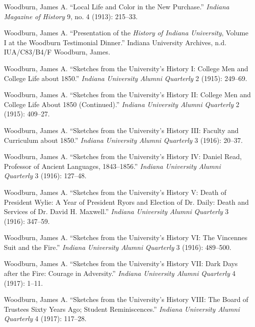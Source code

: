 \documentclass[
  american,
  letterpaper,
]{scrreprt}
\newlength{\cslhangindent}
\newenvironment{CSLReferences}[2] %
 {\begin{list}{}{%
  \setlength{\itemindent}{0pt}
  \setlength{\leftmargin}{0pt}
  \setlength{\parsep}{0pt}
  \ifodd #1
   \setlength{\leftmargin}{\cslhangindent}
   \setlength{\itemindent}{-1\cslhangindent}
  \fi
  \setlength{\itemsep}{#2\baselineskip}}}
 {\end{list}}
\begin{document}
\begin{CSLReferences}{1}{0}
Woodburn, James A. {``Local Life and Color in the New Purchase.''}
\emph{Indiana Magazine of History} 9, no. 4 (1913): 215--33.

Woodburn, James A. {``Presentation of the \emph{History of Indiana
University}, Volume {I} at the Woodburn Testimonial Dinner.''} Indiana
University Archives, n.d. IUA/C83/B4/F Woodburn, James.

Woodburn, James A. {``{Sketches from the University's History I: College
Men and College Life about 1850}.''} \emph{Indiana University Alumni
Quarterly} 2 (1915): 249--69.

Woodburn, James A. {``{Sketches from the University's History II:
College Men and College Life About 1850 (Continued)}.''} \emph{Indiana
University Alumni Quarterly} 2 (1915): 409--27.

Woodburn, James A. {``{Sketches from the University's History III:
Faculty and Curriculum about 1850}.''} \emph{Indiana University Alumni
Quarterly} 3 (1916): 20--37.

Woodburn, James A. {``{Sketches from the University's History IV: Daniel
Read, Professor of Ancient Languages, 1843--1856}.''} \emph{Indiana
University Alumni Quarterly} 3 (1916): 127--48.

Woodburn, James A. {``{Sketches from the University's History V: Death
of President Wylie: A Year of President Ryors and Election of Dr. Daily:
Death and Services of Dr. David H. Maxwell}.''} \emph{Indiana University
Alumni Quarterly} 3 (1916): 347--59.

Woodburn, James A. {``{Sketches from the University's History VI: The
Vincennes Suit and the Fire}.''} \emph{Indiana University Alumni
Quarterly} 3 (1916): 489--500.

Woodburn, James A. {``{Sketches from the University's History VII: Dark
Days after the Fire: Courage in Adversity}.''} \emph{Indiana University
Alumni Quarterly} 4 (1917): 1--11.

Woodburn, James A. {``{Sketches from the University's History VIII: The
Board of Trustees Sixty Years Ago; Student Reminiscences}.''}
\emph{Indiana University Alumni Quarterly} 4 (1917): 117--28.


\end{CSLReferences}
\end{document}
